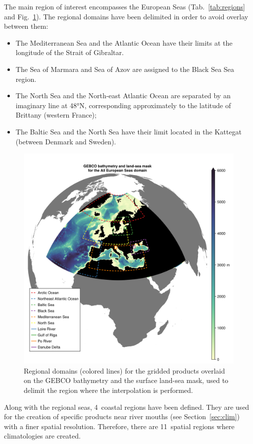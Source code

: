 \documentclass[essd,manuscript]{copernicus}
\begin{document}
The main region of interest encompasses the European Seas (Tab.~\ref{tab:regions} and Fig.~\ref{fig:gebco_bathy_mask_domains3}). The regional domains have been delimited in order to avoid overlay between them:
\begin{itemize}
\item The Mediterranean Sea and the Atlantic Ocean have their limits at the longitude of the Strait of Gibraltar.
\item The Sea of Marmara and Sea of Azov are assigned to the Black Sea  Sea region.
\item The North Sea and the North-east Atlantic Ocean are separated by an imaginary line at 48°N, corresponding approximately to the latitude of Brittany (western France);
\item The Baltic Sea and the North Sea have their limit located in the Kattegat (between Denmark and Sweden).
\end{itemize}

\begin{figure}[t]
\includegraphics[width=12cm]{gebco_bathy_mask_domains3}
\caption{Regional domains (colored lines) for the gridded products overlaid on the GEBCO bathymetry and the surface land-sea mask, used to delimit the region where the interpolation is performed.\label{fig:gebco_bathy_mask_domains3}}
\end{figure}

Along with the regional seas, 4~coastal regions have been defined. They are used for the creation of specific products near river mouths (see Section~\ref{sec:clim}) with a finer spatial resolution. Therefore, there are 11~spatial regions where climatologies are created.
\end{document}
